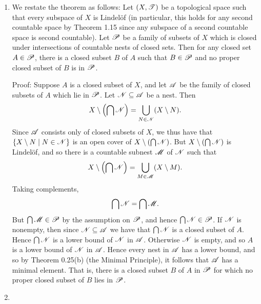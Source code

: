 \begin{prob}
\begin{enumerate}
\item We restate the theorem as follows: Let $(X, \mathscr{T})$ be a topological space such that every subspace of $X$ is Lindelöf (in particular, this holds for any second countable space by Theorem 1.15 since any subspace of a second countable space is second countable). Let $\mathscr{P}$ be a family of subsets of $X$ which is closed under intersections of countable nests of closed sets. Then for any closed set $A \in \mathscr{P}$, there is a closed subset $B$ of $A$ such that $B \in \mathscr{P}$ and no proper closed subset of $B$ is in $\mathscr{P}$.

Proof: Suppose $A$ is a closed subset of $X$, and let $\mathscr{A}$ be the family of closed subsets of $A$ which lie in $\mathscr{P}$. Let $\mathscr{N} \subseteq \mathscr{A}$ be a nest. Then \[X\setminus\left(\bigcap\mathscr{N}\right) = \bigcup_{N \in \mathscr{N}}(X\setminus N).\] Since $\mathscr{A}$ consists only of closed subsets of $X$, we thus have that $\{X\setminus N\mid N \in \mathscr{N}\}$ is an open cover of $X\setminus(\bigcap\mathscr{N})$. But $X\setminus(\bigcap\mathscr{N})$ is Lindelöf, and so there is a countable subnest $\mathscr{M}$ of $\mathscr{N}$ such that \[X\setminus\left(\bigcap\mathscr{N}\right) = \bigcup_{M \in \mathscr{M}}(X\setminus M).\] Taking complements, \[\bigcap\mathscr{N} = \bigcap\mathscr{M}.\] But $\bigcap\mathscr{M} \in \mathscr{P}$ by the assumption on $\mathscr{P}$, and hence $\bigcap\mathscr{N} \in \mathscr{P}$. If $\mathscr{N}$ is nonempty, then since $\mathscr{N} \subseteq \mathscr{A}$ we have that $\bigcap\mathscr{N}$ is a closed subset of $A$. Hence $\bigcap\mathscr{N}$ is a lower bound of $\mathscr{N}$ in $\mathscr{A}$. Otherwise $\mathscr{N}$ is empty, and so $A$ is a lower bound of $\mathscr{N}$ in $\mathscr{A}$. Hence every nest in $\mathscr{A}$ has a lower bound, and so by Theorem 0.25(b) (the Minimal Principle), it follows that $\mathscr{A}$ has a minimal element. That is, there is a closed subset $B$ of $A$ in $\mathscr{P}$ for which no proper closed subset of $B$ lies in $\mathscr{P}$.

\item 
\end{enumerate}
\end{prob}